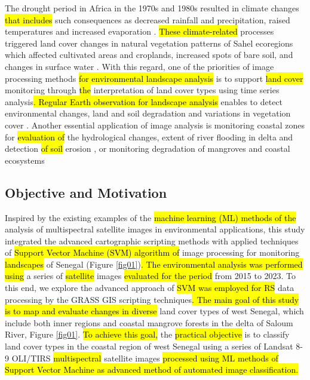 \documentclass[earth,article,submit,pdftex,moreauthors]{Definitions/mdpi}
\begin{document}
The drought period in Africa in the 1970s and 1980s resulted in climate changes\hl{ that includes }such consequences as decreased rainfall and precipitation, raised temperatures and increased evaporation \cite{Paturel,Lemenkova202217}. \hl{These climate-related} processes triggered land cover changes in natural vegetation patterns of Sahel ecoregions which affected cultivated areas and croplands, increased spots of bare soil, and changes in surface water \cite{Fritz,Lemenkova202313}. With this regard, one of the priorities of image processing methods \hl{for environmental landscape analysis }is to support \hl{land cover} monitoring through \hl{the} interpretation of land cover types using time series analysis\hl{. Regular Earth observation for landscape analysis }enables to detect environmental changes, land and soil degradation and variations in vegetation cover \cite{MBOW2008210}. Another essential application of image analysis is monitoring coastal zones for \hl{evaluation of} the hydrological changes, extent of river flooding in delta and detection \hl{of soil }erosion \cite{NDOUR201892,NGOM201634}, or monitoring degradation of mangroves and coastal ecosystems \cite{LOMBARD2023102027,CARNEY2014126}

\subsection{Objective and Motivation}

Inspired by the existing examples of the \hl{machine learning (ML) methods of the }analysis of multispectral satellite images in environmental applications, this study integrated the advanced cartographic\hl{ }scripting methods with applied techniques of \hl{Support Vector Machine (SVM) algorithm of }image processing for monitoring \hl{landscapes} of Senegal (Figure \ref{fig01})\hl{. The environmental analysis was performed using }a series of \hl{satellite }images \hl{evaluated for the period} from 2015 to 2023. To this end, we explore the advanced approach of \hl{SVM was employed for RS } data processing by the GRASS GIS scripting techniques\hl{. The main goal of this study is to map and evaluate changes in diverse} land cover types of west Senegal, which include both inner regions and coastal mangrove forests in the delta of Saloum River, Figure \ref{fig01}. \hl{To achieve this goal, }the \hl{practical objective} is to classify land cover types in the coastal region of west Senegal using a series of Landsat 8-9 OLI/TIRS \hl{multispectral }satellite images \hl{processed using ML methods of Support Vector Machine as advanced method of automated image classification.}
\end{document}
